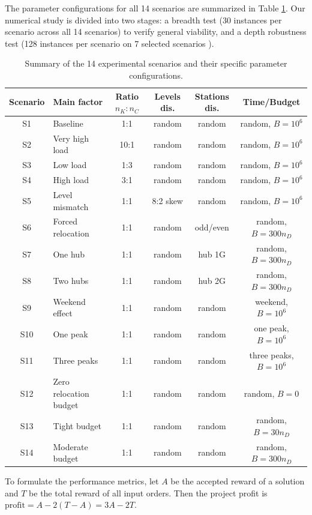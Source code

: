 \documentclass[10pt,a4paper]{article}
\begin{document}
The parameter configurations for all 14 scenarios are summarized in Table \ref{tab:scenarios}. Our numerical study is divided into two stages: a breadth test (30 instances per scenario across all 14 scenarios) to verify general viability, and a depth robustness test (128 instances per scenario on 7 selected scenarios ).

\begin{table}[htbp]
\centering
\small
\caption{Summary of the 14 experimental scenarios and their specific parameter configurations.}
\label{tab:scenarios}
\begin{tabular}{clcccc}
\toprule
Scenario & Main factor & Ratio $n_K:n_C$ & Levels dis. & Stations dis. & Time/Budget \\
\midrule
S1 & Baseline & 1:1 & random & random & random, $B=10^6$\\
S2 & Very high load & 10:1 & random & random & random, $B=10^6$\\
S3 & Low load & 1:3 & random & random & random, $B=10^6$\\
S4 & High load & 3:1 & random & random & random, $B=10^6$\\
S5 & Level mismatch & 1:1 & 8:2 skew & random & random, $B=10^6$\\
S6 & Forced relocation & 1:1 & random & odd/even & random, $B=300n_D$\\
S7 & One hub & 1:1 & random & hub 1G & random, $B=300n_D$\\
S8 & Two hubs & 1:1 & random & hub 2G & random, $B=300n_D$\\
S9 & Weekend effect & 1:1 & random & random & weekend, $B=10^6$\\
S10 & One peak & 1:1 & random & random & one peak, $B=10^6$\\
S11 & Three peaks & 1:1 & random & random & three peaks, $B=10^6$\\
S12 & Zero relocation budget & 1:1 & random & random & random, $B=0$\\
S13 & Tight budget & 1:1 & random & random & random, $B=30n_D$\\
S14 & Moderate budget & 1:1 & random & random & random, $B=300n_D$\\
\bottomrule
\end{tabular}
\end{table}

To formulate the performance metrics, let $A$ be the accepted reward of a solution and $T$ be the total reward of all input orders. Then the project profit is
$\text{profit}=A-2(T-A)=3A-2T$.
\end{document}
